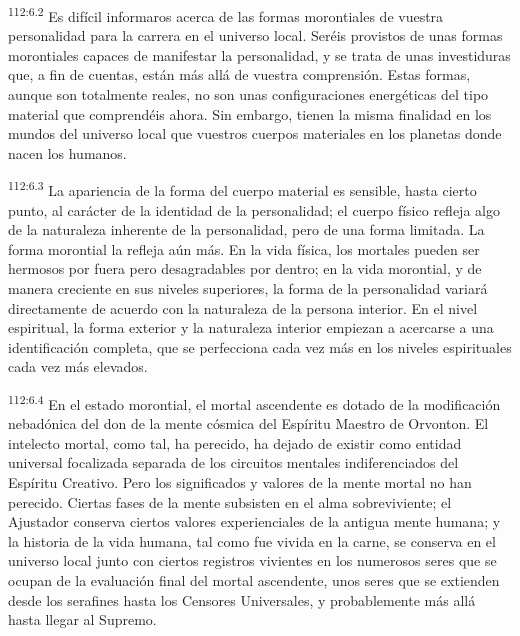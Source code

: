 \documentclass[twoside, 11pt]{book}
\begin{document}
\par
\textsuperscript{112:6.2} Es difícil informaros acerca de las formas morontiales de vuestra personalidad para la carrera en el universo local. Seréis provistos de unas formas morontiales capaces de manifestar la personalidad, y se trata de unas investiduras que, a fin de cuentas, están más allá de vuestra comprensión. Estas formas, aunque son totalmente reales, no son unas configuraciones energéticas del tipo material que comprendéis ahora. Sin embargo, tienen la misma finalidad en los mundos del universo local que vuestros cuerpos materiales en los planetas donde nacen los humanos.

\par
\textsuperscript{112:6.3} La apariencia de la forma del cuerpo material es sensible, hasta cierto punto, al carácter de la identidad de la personalidad; el cuerpo físico refleja algo de la naturaleza inherente de la personalidad, pero de una forma limitada. La forma morontial la refleja aún más. En la vida física, los mortales pueden ser hermosos por fuera pero desagradables por dentro; en la vida morontial, y de manera creciente en sus niveles superiores, la forma de la personalidad variará directamente de acuerdo con la naturaleza de la persona interior. En el nivel espiritual, la forma exterior y la naturaleza interior empiezan a acercarse a una identificación completa, que se perfecciona cada vez más en los niveles espirituales cada vez más elevados.

\par
\textsuperscript{112:6.4} En el estado morontial, el mortal ascendente es dotado de la modificación nebadónica del don de la mente cósmica del Espíritu Maestro de Orvonton. El intelecto mortal, como tal, ha perecido, ha dejado de existir como entidad universal focalizada separada de los circuitos mentales indiferenciados del Espíritu Creativo. Pero los significados y valores de la mente mortal no han perecido. Ciertas fases de la mente subsisten en el alma sobreviviente; el Ajustador conserva ciertos valores experienciales de la antigua mente humana; y la historia de la vida humana, tal como fue vivida en la carne, se conserva en el universo local junto con ciertos registros vivientes en los numerosos seres que se ocupan de la evaluación final del mortal ascendente, unos seres que se extienden desde los serafines hasta los Censores Universales, y probablemente más allá hasta llegar al Supremo.
\end{document}
